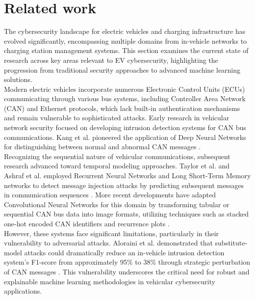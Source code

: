 \section{Related work}
\label{section:related}
The cybersecurity landscape for electric vehicles and charging infrastructure has evolved significantly, encompassing multiple domains from in-vehicle networks to charging station management systems. This section examines the current state of research across key areas relevant to EV cybersecurity, highlighting the progression from traditional security approaches to advanced machine learning solutions. \\

Modern electric vehicles incorporate numerous Electronic Control Units (ECUs) communicating through various bus systems, including Controller Area Network (CAN) and Ethernet protocols, which lack built-in authentication mechanisms and remain vulnerable to sophisticated attacks. Early research in vehicular network security focused on developing intrusion detection systems for CAN bus communications. Kang et al. pioneered the application of Deep Neural Networks for distinguishing between normal and abnormal CAN messages \cite{kang2016intrusion}. \\

Recognizing the sequential nature of vehicular communications, subsequent research advanced toward temporal modeling approaches. Taylor et al. and Ashraf et al. employed Recurrent Neural Networks and Long Short-Term Memory networks to detect message injection attacks by predicting subsequent messages in communication sequences \cite{taylor2016anomaly, ashraf2020novel}. More recent developments have adapted Convolutional Neural Networks for this domain by transforming tabular or sequential CAN bus data into image formats, utilizing techniques such as stacked one-hot encoded CAN identifiers and recurrence plots \cite{seo2018gids, desta2022rec}. \\

However, these systems face significant limitations, particularly in their vulnerability to adversarial attacks. Aloraini et al. demonstrated that substitute-model attacks could dramatically reduce an in-vehicle intrusion detection system's F1-score from approximately 95\% to 38\% through strategic perturbation of CAN messages \cite{aloraini2024adversarial}. This vulnerability underscores the critical need for robust and explainable machine learning methodologies in vehicular cybersecurity applications. \\

